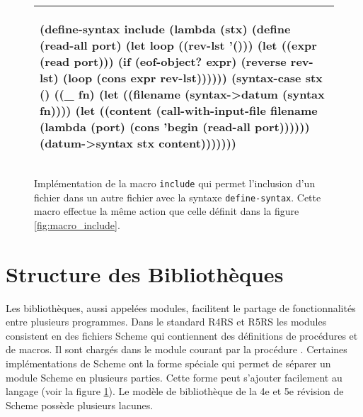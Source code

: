 
\begin{figure}[ht]
\begin{tabular}{|l|}\hline
\begin{mplisting}{0.8}
(define-syntax include
  (lambda (stx)
    (define (read-all port)
      (let loop ((rev-lst '()))
        (let ((expr (read port)))
          (if (eof-object? expr)
            (reverse rev-lst)
            (loop (cons expr rev-lst))))))
    (syntax-case stx ()
      ((_ fn)
       (let ((filename (syntax->datum (syntax fn))))
         (let ((content
                 (call-with-input-file
                    filename
                    (lambda (port)
                      (cons 'begin (read-all port))))))
           (datum->syntax stx content)))))))
\end{mplisting}\\\hline

\end{tabular}
   \caption{Implémentation de la macro \texttt{include} qui permet l'inclusion
   d'un fichier dans un autre fichier avec la syntaxe \texttt{define-syntax}.
   Cette macro effectue la même action que celle définit dans la figure
   \ref{fig:macro_include}.}

   \label{fig:macro_include_def_syntax}
\end{figure}

\section{Structure des Bibliothèques}

Les bibliothèques, aussi appelées modules, facilitent le partage de
fonctionnalités entre plusieurs programmes. Dans le standard
R4RS\cite{Scheme:R4RS} et R5RS\cite{Scheme:R5RS} les modules consistent en des
fichiers Scheme qui contiennent des définitions de procédures et de macros. Il
sont chargés dans le module courant par la procédure . Certaines
implémentations de Scheme ont la forme spéciale  qui permet de
séparer un module Scheme en plusieurs parties. Cette forme peut s'ajouter
facilement au langage (voir la figure \ref{fig:macro_include_def_syntax}).  Le
modèle de bibliothèque de la 4e et 5e révision de Scheme possède plusieurs
lacunes.

